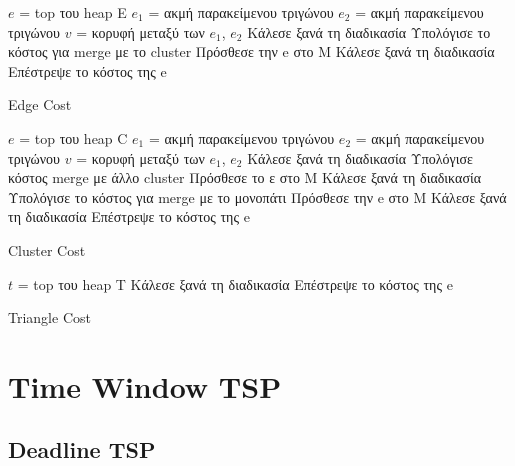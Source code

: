 \documentclass[oneside,12pt]{book}
\theoremstyle{definition}
\begin{document}
\newpage

\begin{algorithm}[H]
	\SetAlgoLined
	
	\(e\) = top του heap Ε \;
	\(e_1\) = ακμή παρακείμενου τριγώνου \;
	\(e_2\) = ακμή παρακείμενου τριγώνου \;	
	\(v\) = κορυφή μεταξύ των \(e_1\), \(e_2\) \;
	{Κάλεσε ξανά τη διαδικασία \;}
	{Υπολόγισε το κόστος για merge με το cluster \;
	Πρόσθεσε την e στο Μ \;
	Κάλεσε ξανά τη διαδικασία \;}
	Επέστρεψε το κόστος της e \;
	
	\caption{Edge Cost}
\end{algorithm}

\newpage

\begin{algorithm}[H]
	\SetAlgoLined
	
	\(e\) = top του heap C \;
	\(e_1\) = ακμή παρακείμενου τριγώνου \;
	\(e_2\) = ακμή παρακείμενου τριγώνου \;	
	\(v\) = κορυφή μεταξύ των \(e_1\), \(e_2\) \;
	{
		{Κάλεσε ξανά τη διαδικασία \;}}
	Υπολόγισε κόστος merge με άλλο cluster \;
	Πρόσθεσε το ε στο Μ \;
	Κάλεσε ξανά τη διαδικασία \;
	{Υπολόγισε το κόστος για merge με το μονοπάτι \;
		Πρόσθεσε την e στο Μ \;
		Κάλεσε ξανά τη διαδικασία \;}
	Επέστρεψε το κόστος της e \;
	
	\caption{Cluster Cost}
\end{algorithm}

\begin{algorithm}[H]
	\SetAlgoLined
	
	\(t\) = top του heap T \;
	{Κάλεσε ξανά τη διαδικασία \;}
	Επέστρεψε το κόστος της e \;
	
	\caption{Triangle Cost}
\end{algorithm}

\section{Time Window TSP}

\subsection{Deadline TSP}
\end{document}
